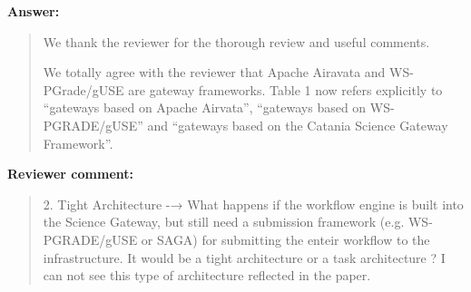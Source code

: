 \documentclass[a4]{article}
\newenvironment{review}%
{\textbf{Reviewer comment:}\begin{quote}}%
{\end{quote}}%
\newenvironment{answer}%
{\textbf{Answer:}\begin{small}\begin{quote}}%
{\end{quote}\end{small}}%
\begin{document}
\begin{answer}
We thank the reviewer for the thorough review and useful comments.

We totally agree with the reviewer that Apache Airavata and
WS-PGrade/gUSE are gateway frameworks. Table 1 now refers explicitly
to ``gateways based on Apache Airvata'', ``gateways based on
WS-PGRADE/gUSE'' and ``gateways based on the Catania Science Gateway
Framework''. 
\end{answer}


\begin{review}
  2. Tight Architecture -→ What happens if the workflow engine is
  built into the Science Gateway, but still need a submission
  framework (e.g. WS-PGRADE/gUSE or SAGA) for submitting the enteir
  workflow to the infrastructure.  It would be a tight architecture or
  a task architecture ? I can not see this type of architecture
  reflected in the paper.
\end{review}
\end{document}
